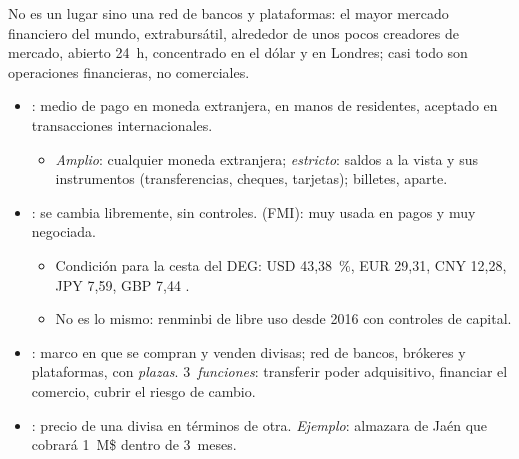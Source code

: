 \documentclass{article}
\begin{document}
\begin{columnas}
\begin{itemize}
\end{itemize}

\begin{ideaclave}
No es un lugar sino una red de bancos y plataformas: el mayor mercado financiero del mundo, extrabursátil, alrededor de unos pocos creadores de mercado, abierto 24~h, concentrado en el dólar y en Londres; casi todo son operaciones financieras, no comerciales.
\end{ideaclave}

\begin{itemize}
\item {}: medio de pago en moneda extranjera, en manos de residentes, aceptado en transacciones internacionales.
  \begin{itemize}
  \item \emph{Amplio}: cualquier moneda extranjera; \emph{estricto}: saldos a la vista y sus instrumentos (transferencias, cheques, tarjetas); billetes, aparte.
  \end{itemize}
\item {}: se cambia libremente, sin controles.  (FMI): muy usada en pagos y muy negociada.
  \begin{itemize}
  \item Condición para la cesta del DEG: USD 43,38~\%, EUR 29,31, CNY 12,28, JPY 7,59, GBP 7,44 .
  \item No es lo mismo: renminbi de libre uso desde 2016 con controles de capital.
  \end{itemize}
\item {}: marco en que se compran y venden divisas; red de bancos, brókeres y plataformas, con \emph{plazas}. 3~\emph{funciones}: transferir poder adquisitivo, financiar el comercio, cubrir el riesgo de cambio.
\item {}: precio de una divisa en términos de otra. \emph{Ejemplo}: almazara de Jaén que cobrará 1~M\$ dentro de 3~meses.
\end{itemize}


\end{columnas}
\end{document}
